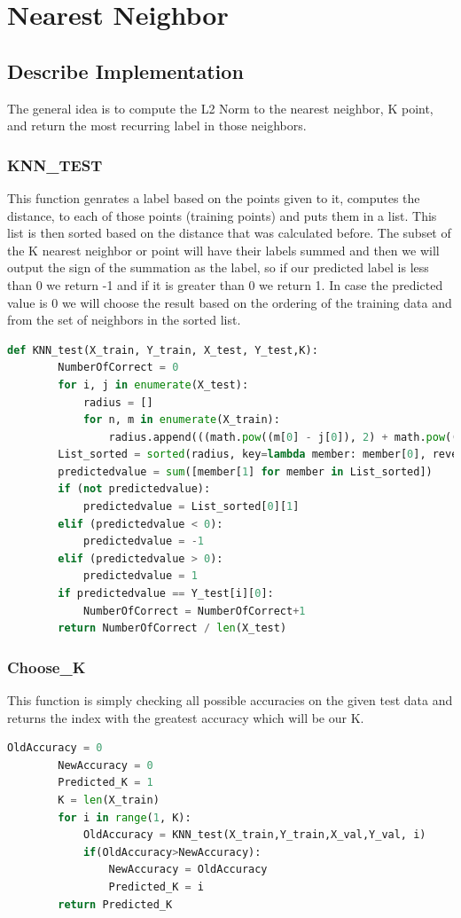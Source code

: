 \documentclass{article}
\begin{document}
	\section{Nearest Neighbor}
	\subsection{Describe Implementation}
	The general idea is to compute the L2 Norm to the nearest neighbor, K point, and return the most recurring label in those neighbors.

	\subsubsection{KNN\_TEST}
	This function genrates a label based on the points given to it, computes the distance, to each of those points (training points) and puts them in a list. This list is then sorted based on the distance that was calculated before. The subset of the K nearest neighbor or point will have their labels summed and then we will output the sign of the summation as the label, so if our predicted label is less than 0 we return -1 and if it is greater than 0 we return 1. In case the predicted value is 0 we will choose the result based on the ordering of the training data and from the set of neighbors in the sorted list.
	\begin{lstlisting}[language=Python]
	def KNN_test(X_train, Y_train, X_test, Y_test,K):
		NumberOfCorrect = 0
		for i, j in enumerate(X_test):
			radius = []
			for n, m in enumerate(X_train):
				radius.append(((math.pow((m[0] - j[0]), 2) + math.pow((m[1] - j[1]), 2)), Y_train[n][0]))
		List_sorted = sorted(radius, key=lambda member: member[0], reverse=False)[:K]
		predictedvalue = sum([member[1] for member in List_sorted])
		if (not predictedvalue):
			predictedvalue = List_sorted[0][1]
		elif (predictedvalue < 0):
			predictedvalue = -1
		elif (predictedvalue > 0):
			predictedvalue = 1
		if predictedvalue == Y_test[i][0]:
			NumberOfCorrect = NumberOfCorrect+1
		return NumberOfCorrect / len(X_test)
	\end{lstlisting}

	\subsubsection{Choose\_K}
	This function is simply checking all possible accuracies on the given test data and returns the index with the greatest accuracy which will be our K.
	\begin{lstlisting}[language=Python]
		OldAccuracy = 0
		NewAccuracy = 0
		Predicted_K = 1
		K = len(X_train)
		for i in range(1, K):
			OldAccuracy = KNN_test(X_train,Y_train,X_val,Y_val, i)
			if(OldAccuracy>NewAccuracy):
				NewAccuracy = OldAccuracy
				Predicted_K = i
		return Predicted_K
	\end{lstlisting}
\end{document}
